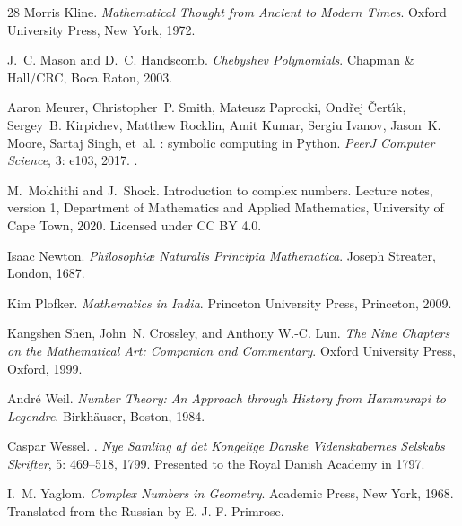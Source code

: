 \documentclass[11pt,a4paper]{amsart}
\theoremstyle{plain}
\theoremstyle{definition}
\theoremstyle{remark}
\begin{document}
\begin{thebibliography}{28}
Morris Kline.
\newblock \emph{Mathematical Thought from Ancient to Modern Times}.
\newblock Oxford University Press, New York, 1972.

J.~C. Mason and D.~C. Handscomb.
\newblock \emph{{Chebyshev} Polynomials}.
\newblock Chapman \& Hall/CRC, Boca Raton, 2003.

Aaron Meurer, Christopher~P. Smith, Mateusz Paprocki, Ond{\v{r}}ej
  {\v{C}}ert{\'\i}k, Sergey~B. Kirpichev, Matthew Rocklin, Amit Kumar, Sergiu
  Ivanov, Jason~K. Moore, Sartaj Singh, et~al.
: symbolic computing in {Python}.
\newblock \emph{PeerJ Computer Science}, 3: e103, 2017.
\newblock {}.

M.~Mokhithi and J.~Shock.
\newblock Introduction to complex numbers.
\newblock Lecture notes, version 1, Department of Mathematics and Applied
  Mathematics, University of Cape Town, 2020.
\newblock Licensed under CC BY 4.0.

Isaac Newton.
\newblock \emph{Philosophi{\ae} Naturalis Principia Mathematica}.
\newblock Joseph Streater, London, 1687.

Kim Plofker.
\newblock \emph{Mathematics in India}.
\newblock Princeton University Press, Princeton, 2009.

Kangshen Shen, John~N. Crossley, and Anthony W.-C. Lun.
\newblock \emph{The Nine Chapters on the Mathematical Art: Companion and
  Commentary}.
\newblock Oxford University Press, Oxford, 1999.

Andr{\'e} Weil.
\newblock \emph{Number Theory: An Approach through History from {Hammurapi} to
  {Legendre}}.
\newblock Birkh{\"a}user, Boston, 1984.

Caspar Wessel.
.
\newblock \emph{Nye Samling af det Kongelige Danske Videnskabernes Selskabs
  Skrifter}, 5: 469--518, 1799.
\newblock Presented to the Royal Danish Academy in 1797.

I.~M. Yaglom.
\newblock \emph{Complex Numbers in Geometry}.
\newblock Academic Press, New York, 1968.
\newblock Translated from the Russian by E. J. F. Primrose.

\end{thebibliography}
\end{document}
